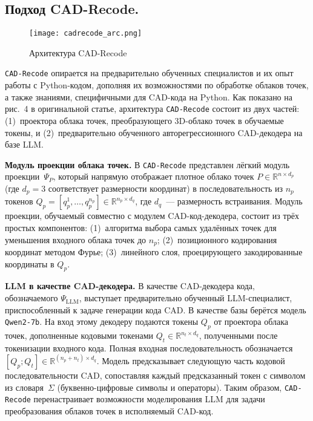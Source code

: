 \subsection{Подход CAD-Recode.}

\begin{figure}[h!]
    \centering
    \texttt{[image: cadrecode\_arc.png]}
    \caption{Архитектура CAD-Recode}
    \label{fig:cadrecode_arc}
\end{figure}

\texttt{CAD-Recode} опирается на предварительно обученных специалистов и их опыт
работы с Python-кодом, дополняя их возможностями по обработке облаков точек, а
также знаниями, специфичными для CAD-кода на Python. Как показано на рис.~4 в
оригинальной статье, архитектура \texttt{CAD-Recode} состоит из двух частей:
(1)~проектора облака точек, преобразующего 3D-облако точек в обучаемые токены, и
(2)~предварительно обученного авторегрессионного CAD-декодера на базе LLM.

\textbf{Модуль проекции облака точек.} В \texttt{CAD-Recode} представлен лёгкий
модуль проекции~$\Psi_P$, который напрямую отображает плотное облако точек
$P \in \mathbb{R}^{n \times d_p}$ (где $d_p = 3$ соответствует размерности
координат) в последовательность из $n_p$ токенов $Q_p = [q^1_p, \dots, q^{n_p}_p]
    \in \mathbb{R}^{n_p \times d_q}$, где $d_q$~--- размерность встраивания. Модуль
проекции, обучаемый совместно с модулем CAD-код-декодера, состоит из трёх простых
компонентов: (1)~алгоритма выбора самых удалённых точек для уменьшения входного
облака точек до $n_p$; (2)~позиционного кодирования координат методом Фурье;
(3)~линейного слоя, проецирующего закодированные координаты в $Q_p$.

\textbf{LLM в качестве CAD-декодера.} В качестве CAD-декодера кода, обозначаемого
$\Psi_{\text{LLM}}$, выступает предварительно обученный LLM-специалист,
приспособленный к задаче генерации кода CAD. В качестве базы берётся модель
\texttt{Qwen2-7b}. На вход этому декодеру подаются токены $Q_p$ от проектора облака точек,
дополненные кодовыми токенами $Q_t \in \mathbb{R}^{n_t \times d_q}$,
полученными после токенизации входного кода. Полная
входная последовательность обозначается $[Q_p; Q_t] \in
    \mathbb{R}^{(n_p + n_t) \times d_q}$. Модель предсказывает следующую часть
кодовой последовательности CAD, сопоставляя каждый предсказанный токен с
символом из словаря~$\Sigma$ (буквенно-цифровые символы и операторы). Таким
образом, \texttt{CAD-Recode} перенастраивает возможности моделирования LLM для
задачи преобразования облаков точек в исполняемый CAD-код.

